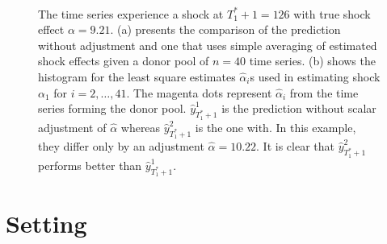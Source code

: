 \documentclass[11pt,3p,review,authoryear]{elsarticle}
\theoremstyle{definition}
\begin{document}
\begin{figure}[t!]
  \begin{center}
    \\
  \end{center}
     \caption{The time series experience a shock at $T_1^*+1=126$ with true shock effect $\alpha = 9.21$. (a) presents the comparison of the prediction without adjustment and one that uses simple averaging of estimated shock effects given a donor pool of $n=40$ time series. (b) shows the histogram for the least square estimates $\hat{\alpha}_i$s used in estimating shock $\alpha_1$ for $i = 2, \ldots, 41$.  The magenta dots represent $\hat{\alpha}_i$ from the time series forming the donor pool. $\hat{y}^{1}_{T_1^*+1}$ is the prediction without scalar adjustment of $\hat{\alpha}$ whereas $\hat{y}^{2}_{T_1^*+1}$ is the one with. In this example,
    they differ only by an adjustment $\hat{\alpha}=10.22$. It is clear that $\hat{y}^{2}_{T_1^*+1}$ performs better than $\hat{y}^{1}_{T_1^*+1}$.}\label{figure1}
\end{figure}


\section{Setting}
\label{setting}
\end{document}
